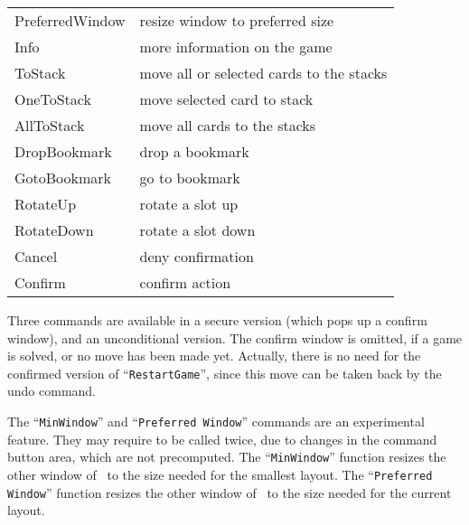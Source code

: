 \begin{center}
\begin{tabular}{|l|l|}
        PreferredWindow & resize window to preferred size\\
        Info           & more information on the game\\
        ToStack        & move all or selected cards to the stacks\\
        OneToStack     & move selected card to stack\\
        AllToStack     & move all cards to the stacks\\
        DropBookmark   & drop a bookmark\\
        GotoBookmark   & go to bookmark\\
        RotateUp       & rotate a slot up\\
        RotateDown     & rotate a slot down\\
        Cancel         & deny confirmation\\
        Confirm        & confirm action\\
      \hline
    \end{tabular}
\end{center}
Three commands are available in a secure version (which pops up a confirm
window), and an unconditional version.
The confirm window is omitted, if a game is solved, or no move has been made
yet.
Actually, there is no need for the confirmed version of ``{\tt RestartGame}'', since this
move can be taken back by the undo command.

The ``{\tt MinWindow}'' and ``{\tt Preferred Window}'' commands are an
experimental feature. They may require to be called twice, due to changes
in the command button area, which are not precomputed.
The  ``{\tt MinWindow}'' function resizes the other window of \xpat\ to the
size needed for the smallest layout. The  ``{\tt Preferred Window}'' function
resizes the other window of \xpat\ to the size needed for the current layout.


